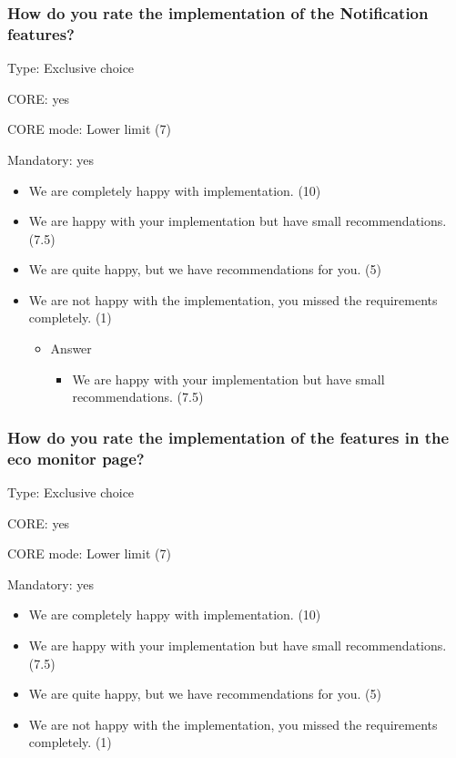 \subsubsection{How do you rate the implementation of the Notification features?}
\label{sec:orgef07d7b}

Type: Exclusive choice 

CORE: yes

CORE mode: Lower limit (7) 

Mandatory: yes 

\begin{itemize}
	\item We are completely happy with implementation. (10) 
	\item We are happy with your implementation but have small recommendations. (7.5) 
	\item We are quite happy, but we have recommendations for you. (5) 
	\item We are not happy with the implementation, you missed the requirements completely. (1) 
	
	\begin{itemize}
		\item Answer
				\begin{itemize}
					\item 	We are happy with your implementation but have small recommendations. (7.5) 
				\end{itemize}
	\end{itemize}

\end{itemize}

\subsubsection{How do you rate the implementation of the features in the eco monitor page?}
\label{sec:orge846696}

Type: Exclusive choice 

CORE: yes

CORE mode: Lower limit (7) 

Mandatory: yes 

\begin{itemize}
	\item We are completely happy with implementation. (10) 
	\item We are happy with your implementation but have small recommendations. (7.5) 
	\item We are quite happy, but we have recommendations for you. (5) 
	\item We are not happy with the implementation, you missed the requirements completely. (1)
\end{itemize}


